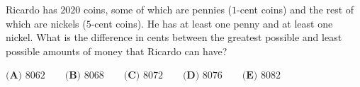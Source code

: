 Ricardo has $2020$ coins, some of which are pennies ($1$-cent coins) and the rest of which are nickels ($5$-cent coins). He has at least one penny and at least one nickel. What is the difference in cents between the greatest possible and least possible amounts of money that Ricardo can have?

$\textbf{(A) }8062\qquad\textbf{(B) }8068\qquad\textbf{(C) }8072\qquad\textbf{(D) }8076\qquad\textbf{(E) }8082$
